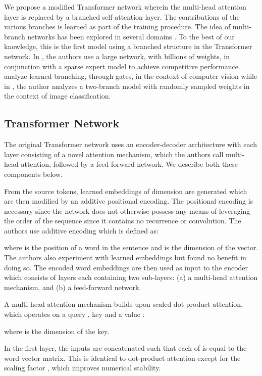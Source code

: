 \documentclass{article} \usepackage{iclr2018_conference,times}
\begin{document}
We propose a modified Transformer network wherein the multi-head attention layer is replaced by a branched self-attention layer. The contributions of the various branches is learned as part of the training procedure. The idea of multi-branch networks has been explored in several domains \citep{ahmed2017branchconnect,gastaldi2017shake,shazeer2017outrageously,xie2016aggregated}. To the best of our knowledge, this is the first model using a branched structure in the Transformer network. In \citet{shazeer2017outrageously}, the authors use a large network, with billions of weights, in conjunction with a sparse expert model to achieve competitive performance. \citet{ahmed2017branchconnect} analyze learned branching, through gates, in the context of computer vision while in \citet{gastaldi2017shake}, the author analyzes a two-branch model with randomly sampled weights in the context of image classification.  


\subsection{Transformer Network}
The original Transformer network uses an encoder-decoder architecture with each layer consisting of a novel attention mechanism, which the authors call multi-head attention, followed by a feed-forward network. We describe both these components below.

From the source tokens, learned embeddings of dimension  are generated which are then modified by an additive positional encoding. The positional encoding is necessary since the network does not otherwise possess any means of leveraging the order of the sequence since it contains no recurrence or convolution. The authors use additive encoding which is defined as:


where  is the position of a word in the sentence and  is the dimension of the vector.
The authors also experiment with learned embeddings \citep{gehring2016convenc,gehring2017convs2s} but found no benefit in doing so. The encoded word embeddings are then used as input to the encoder which consists of  layers each containing two sub-layers: (a) a multi-head attention mechanism, and (b) a feed-forward network. 
 
A multi-head attention mechanism builds upon scaled dot-product attention, which operates on a query , key  and a value :

where  is the dimension of the key. 

In the first layer, the inputs are concatenated such that each of  is equal to the word vector matrix. 
This is identical to dot-product attention except for the scaling factor , which improves numerical stability. 
\end{document}
